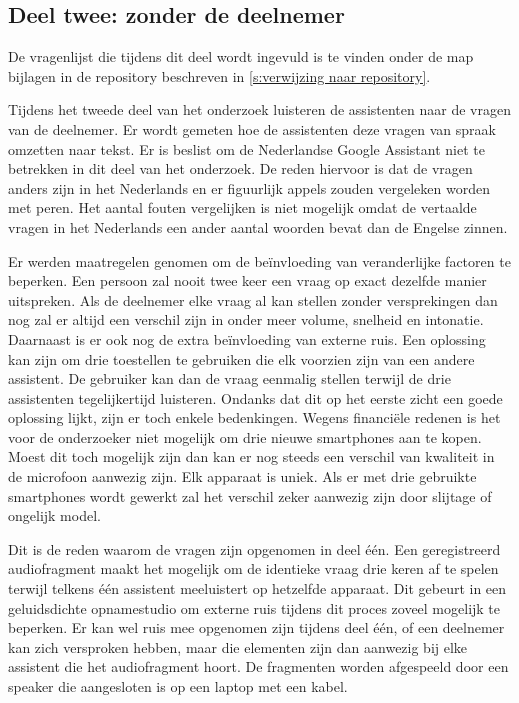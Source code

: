 \subsection{Deel twee: zonder de deelnemer}
De vragenlijst die tijdens dit deel wordt ingevuld is te vinden onder de map bijlagen in de repository beschreven in \ref{s:verwijzing naar repository}.

Tijdens het tweede deel van het onderzoek luisteren de assistenten naar de vragen van de deelnemer. Er wordt gemeten hoe de assistenten deze vragen van spraak omzetten naar tekst. 
Er is beslist om de Nederlandse Google Assistant niet te betrekken in dit deel van het onderzoek. De reden hiervoor is dat de vragen anders zijn in het Nederlands en er figuurlijk appels zouden vergeleken worden met peren. Het aantal fouten vergelijken is niet mogelijk omdat de vertaalde vragen in het Nederlands een ander aantal woorden bevat dan de Engelse zinnen.

Er werden maatregelen genomen om de beïnvloeding van veranderlijke factoren te beperken. Een persoon zal nooit twee keer een vraag op exact dezelfde manier uitspreken. Als de deelnemer elke vraag al kan stellen zonder versprekingen dan nog zal er altijd een verschil zijn in onder meer volume, snelheid en intonatie. Daarnaast is er ook nog de extra beïnvloeding van externe ruis.
Een oplossing kan zijn om drie toestellen te gebruiken die elk voorzien zijn van een andere assistent. De gebruiker kan dan de vraag eenmalig stellen terwijl de drie assistenten tegelijkertijd luisteren. Ondanks dat dit op het eerste zicht een goede oplossing lijkt, zijn er toch enkele bedenkingen. Wegens financiële redenen is het voor de onderzoeker niet mogelijk om drie nieuwe smartphones aan te kopen. Moest dit toch mogelijk zijn dan kan er nog steeds een verschil van kwaliteit in de microfoon aanwezig zijn. Elk apparaat is uniek. Als er met drie gebruikte smartphones wordt gewerkt zal het verschil zeker aanwezig zijn door slijtage of ongelijk model.

Dit is de reden waarom de vragen zijn opgenomen in deel één. Een geregistreerd audiofragment maakt het mogelijk om de identieke vraag drie keren af te spelen terwijl telkens één assistent meeluistert op hetzelfde apparaat. Dit gebeurt in een geluidsdichte opnamestudio om externe ruis tijdens dit proces zoveel mogelijk te beperken. Er kan wel ruis mee opgenomen zijn tijdens deel één, of een deelnemer kan zich versproken hebben, maar die elementen zijn dan aanwezig bij elke assistent die het audiofragment hoort. De fragmenten worden afgespeeld door een speaker die aangesloten is op een laptop met een kabel.

